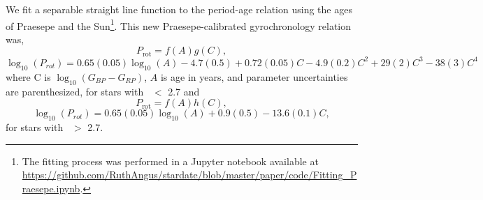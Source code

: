 We fit a separable straight line function to the period-age relation using
the ages of Praesepe and the Sun\footnote{The fitting process was
performed in a Jupyter notebook available at
\url{https://github.com/RuthAngus/stardate/blob/master/paper/code/Fitting_Praesepe.ipynb}.}.
This new Praesepe-calibrated gyrochronology relation was,
\begin{equation}
    P_\mathrm{rot} = f(A)g(C) \nonumber,
\end{equation}
\begin{equation}
    \log_{10}(P_{rot}) = 0.65(0.05)\log_{10}(A) -4.7(0.5) + 0.72(0.05)C
    -4.9(0.2)C^2 + 29(2)C^3 -38(3)C^4
\end{equation}
where C is $\log_{10}(G_{BP}-G_{RP})$, $A$ is age in years, and parameter
uncertainties are parenthesized, for stars with \gcolor\ $<$ 2.7 and
\begin{equation}
    P_{\mathrm{rot}} = f(A)h(C) \nonumber,
\end{equation}
\begin{equation}
    \log_{10}(P_{rot}) = 0.65(0.05)\log_{10}(A) + 0.9(0.5) -13.6(0.1)C,
\end{equation}
for stars with \gcolor\ $>$ 2.7.

